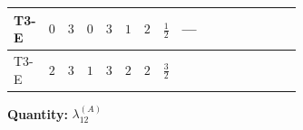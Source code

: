 \documentclass[8pt]{article}
\begin{document}
\begin{landscape}
\begin{longtable}{@{}llcccccc >{\raggedright\arraybackslash}p{0.21\linewidth} >{\raggedright\arraybackslash}p{0.21\linewidth} >{\raggedright\arraybackslash}p{0.21\linewidth}@{}}
\midrule
T3-E & $0$ & $3$ & $0$ & $3$ & $1$ & $2$ & $\frac{1}{2}$ & --- & \scriptsize\adjustbox{max width=\linewidth}{$\begin{gathered} -24 {g_2}^2 {\lambda_{12}^{(A)}}\end{gathered}$} & \scriptsize\adjustbox{max width=\linewidth}{$\begin{gathered} +8 {\lambda_{12}^{(1)}} {\lambda_{12}^{(A)}}\end{gathered}$} \\
\midrule
T3-E & $2$ & $3$ & $1$ & $3$ & $2$ & $2$ & $\frac{3}{2}$ & \scriptsize\adjustbox{max width=\linewidth}{$\begin{gathered} +{g_1}^2 \left(16 {g_2}^2-30 {\lambda_{12}^{(A)}}\right)\end{gathered}$} & \scriptsize\adjustbox{max width=\linewidth}{$\begin{gathered} -24 {g_2}^2 {\lambda_{12}^{(A)}}\end{gathered}$} & \scriptsize\adjustbox{max width=\linewidth}{$\begin{gathered} +8 {\lambda_{12}^{(1)}} {\lambda_{12}^{(A)}}\end{gathered}$} \\
\midrule
\bottomrule
\end{longtable}
\clearpage
\noindent\textbf{Quantity: }$\lambda_{12}^{(A)}$\par\smallskip

\end{landscape}
\end{document}
